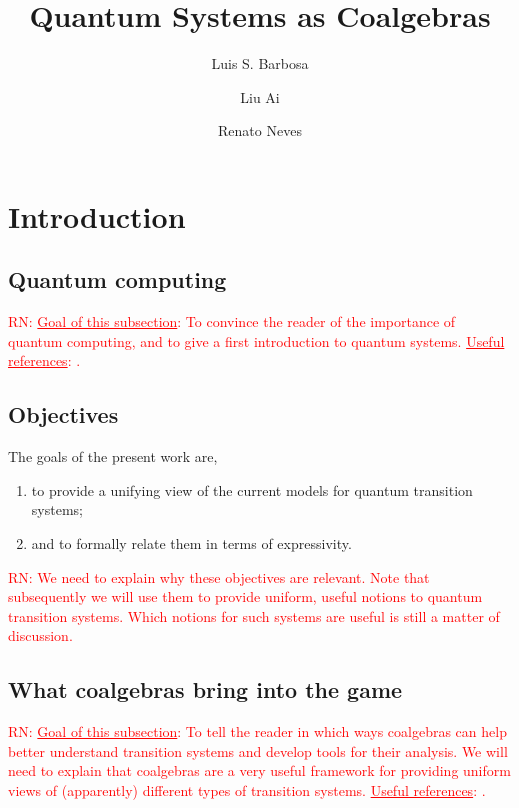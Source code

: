 \documentclass[a4paper, 11pt]{article}
\newcommand{\nevComment}[1]{\textcolor{red}{RN: #1}}
\begin{document}
\title{Quantum Systems as Coalgebras}
\author{Luis S. Barbosa \and Liu Ai \and Renato Neves}
\maketitle

\section{Introduction}

\subsection{Quantum computing}

\nevComment{\underline{Goal of this subsection}: To convince the
  reader of the importance of quantum computing, and to give a first
  introduction to quantum systems.  \underline{Useful references}:
  \cite{nielsen2002quantum,NM08,ying16}. }

\subsection{Objectives}

The goals of the present work are,
\begin{enumerate}
\item to provide a unifying view of the
  current models for quantum transition systems;
\item and to formally relate them in terms of expressivity.
\end{enumerate}
\nevComment{We need to explain why these objectives are relevant.
  Note that subsequently we will use them to provide uniform, useful
  notions to quantum transition systems. Which notions for
  such systems are useful is still a matter of
  discussion.}

\subsection{What coalgebras bring into the game}

\nevComment{\underline{Goal of this subsection}: To tell the reader in
  which ways coalgebras can help better understand transition systems
  and develop tools for their analysis.  We will need to explain that
  coalgebras are a very useful framework for providing
  uniform views of (apparently) different types of transition
  systems. \underline{Useful references}:
  \cite{rutten2000,Jacobs16,sokolova,neves17}. }
\end{document}
